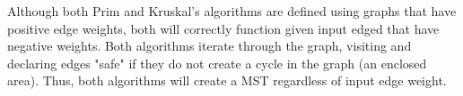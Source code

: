 Although both Prim and Kruskal's algorithms are defined using graphs that have positive edge weights, both will correctly function given input edged that have negative weights. Both algorithms iterate through the graph, visiting and declaring edges "safe" if they do not create a cycle in the graph (an enclosed area). Thus, both algorithms will create a MST regardless of input edge weight.